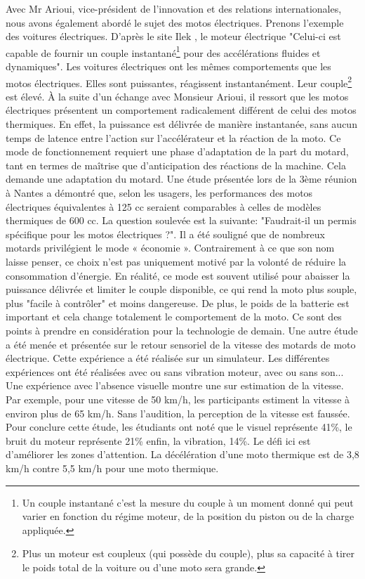 Avec Mr Arioui, vice-président de l’innovation et des relations internationales, nous avons également abordé le sujet des motos électriques. Prenons l'exemple des voitures électriques.
D'après le site Ilek \cite{voiture_electrique}, le moteur électrique "Celui-ci est capable de fournir un couple instantané\footnote{Un couple instantané c’est la mesure du couple à un moment donné qui peut varier en fonction du régime moteur, de la position du piston ou de la charge appliquée.} pour des accélérations fluides et dynamiques". Les voitures électriques ont les mêmes comportements que les motos électriques. Elles sont puissantes, réagissent instantanément. Leur couple\footnote{Plus un moteur est coupleux (qui possède du couple), plus sa capacité à tirer le poids total de la voiture ou d'une moto sera grande.} est élevé.
À la suite d’un échange avec Monsieur Arioui, il ressort que les motos électriques présentent un comportement radicalement différent de celui des motos thermiques. En effet, la puissance est délivrée de manière instantanée, sans aucun temps de latence entre l’action sur l’accélérateur et la réaction de la moto. Ce mode de fonctionnement requiert une phase d’adaptation de la part du motard, tant en termes de maîtrise que d’anticipation des réactions de la machine. Cela demande une adaptation du motard. Une étude présentée lors de la 3ème réunion  \cite{reunionProjet2025} à Nantes a démontré que, selon les usagers, les performances des motos électriques équivalentes à 125 cc seraient comparables à celles de modèles thermiques de 600 cc. La question soulevée est la suivante: "Faudrait-il un permis spécifique pour les motos électriques ?".
Il a été souligné que de nombreux motards privilégient le mode « économie ». Contrairement à ce que son nom laisse penser, ce choix n’est pas uniquement motivé par la volonté de réduire la consommation d'énergie. En réalité, ce mode est souvent utilisé pour abaisser la puissance délivrée et limiter le couple disponible, ce qui rend la moto plus souple, plus "facile à contrôler" et moins dangereuse. 
De plus, le poids de la batterie est important et cela change totalement le comportement de la moto. Ce sont des points à prendre en considération pour la technologie de demain.
Une autre étude a été menée et présentée\cite{reunionProjet2025} sur le retour sensoriel de la vitesse des motards de moto électrique. Cette expérience a été réalisée sur un simulateur. Les différentes expériences ont été réalisées avec ou sans vibration moteur, avec ou sans son... Une expérience avec l'absence visuelle montre une sur estimation de la vitesse. Par exemple, pour une vitesse de 50 km/h, les participants estiment la vitesse à environ plus de 65 km/h. Sans l'audition, la perception de la vitesse est faussée. Pour conclure cette étude, les étudiants ont noté que le visuel représente 41\%, le bruit du moteur représente 21\% enfin, la vibration, 14\%. Le défi ici est d'améliorer les zones d'attention. La décélération d'une moto thermique est de 3,8 km/h contre 5,5 km/h pour une moto thermique.
\vspace{0.5cm} %

